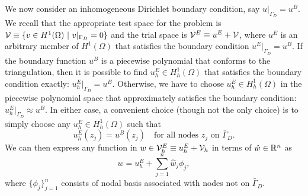 We now consider an inhomogeneous Dirichlet boundary condition, say $u|_{\Gamma_D} = u^B$. We recall that the appropriate test space for the problem is $\calV \equiv \{ v \in H^1(\Omega) \ | \ v|_{\Gamma_D} = 0 \}$ and the trial space is $\mathcal{V}^E \equiv u^E + \mathcal{V}$, where $u^E$ is an arbitrary member of $H^1(\Omega)$ that satisfies the boundary condition $u^E|_{\Gamma_D} = u^B$.  If the boundary function $u^B$ is a piecewise polynomial that conforms to the triangulation, then it is possible to find $u^E_h \in H^1_h(\Omega)$ that satisfies the boundary condition exactly: $u^E_h|_{\Gamma_D} = u^B$.  Otherwise, we have to choose $u^E_h \in H^1_h(\Omega)$ in the piecewise polynomial space that approximately satisfies the boundary condition: $u^E_h|_{\Gamma_D} \approx u^B$.  In either case, a convenient choice (though not the only choice) is to simply choose any $u^E_h \in H^1_h(\Omega)$ such that
\begin{equation*}
  u^E_h(z_j) = u^B(z_j) \quad \text{for all nodes } z_j \text{ on } \bar \Gamma_D.
\end{equation*}
We can then express any function in $w \in \mathcal{V}_h^E \equiv u_h^E + \mathcal{V}_h$ in terms of $\hat w \in \mathbb{R}^n$ as
\begin{equation*}
  w = u^E_h + \sum_{j=1}^n \hat w_j \phi_j,
\end{equation*}
where $\{\phi_j\}_{j=1}^n$ consists of nodal basis associated with nodes not on $\bar \Gamma_D$.



  


